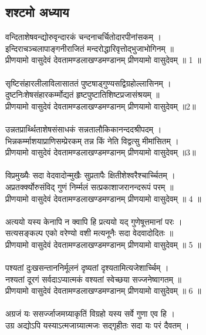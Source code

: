 \subsection{\sanskrit शश्टमो अध्याय}
\sanskrit
 वन्दिताशेषवन्द्योरुवृन्दारकं चन्दनाचर्चितोदारपीनांसकम् ।\\
इन्दिराचञ्चलापाङ्गनीराजितं मन्दरोद्धारिवृत्तोद्भुजाभोगिनम् ॥\\
प्रीणयामो वासुदेवं देवतामण्डलाखण्डमण्डानम् प्रीणयामो वासुदेवम् ॥ 1 ॥\\
\\
 सृष्टिसंहारलीलाविलासाततं पुष्टषाड्गुण्यसद्विग्रहोल्लासिनम् ।\\
दुष्टनिःशेषसंहारकर्म्मोद्यतं हृष्टपुष्टातिशिष्टप्रजासंश्रयम् ॥\\
प्रीणयामो वासुदेवं देवतामण्डलाखण्डमण्डानम् प्रीणयामो वासुदेवम्  ॥2॥\\
\\
उन्नतप्रार्थ्थिताशेषसंसाधकं सन्नतालौकिकानन्ददश्रीपदम् ।\\
भिन्नकर्म्माशयाप्राणिसम्प्रेरकम् तन्न किं नेति विद्वत्सु मीमांसितम् ।\\
प्रीणयामो वासुदेवं देवतामण्डलाखण्डमण्डानम् प्रीणयामो वासुदेवम् ॥3॥\\
\\
विप्रमुख्यैः सदा वेदवादोन्मुखैः सुप्रतापैः क्षितीशेश्वरैश्चार्च्चितम् ।\\
अप्रतर्क्क्योरुसंविद् गुणं निर्म्मलं सत्प्रकाशाजरानन्दरूपं परम् ॥\\
प्रीणयामो वासुदेवं देवतामण्डलाखण्डमण्डानम् प्रीणयामो वासुदेवम् ॥ 4 ॥\\
\\
 अत्ययो यस्य केनापि न क्वापि हि प्रत्ययो यद् गुणेषूत्तमानां परः ।\\
सत्यसङ्कल्प एको वरेण्यो वशी मत्यनूनैः सदा वेदवादोदितः ॥\\
प्रीणयामो वासुदेवं देवतामण्डलाखण्डमण्डानम् प्रीणयामो वासुदेवम् ॥ 5 ॥\\
\\
पश्यतां दुःखसन्ताननिर्मूलनं दृष्यतां दृश्यतामित्यजेशार्च्चिम् ।\\
नश्यतां दूरगं सर्वदाऽप्यात्मकं वश्यतां स्वेच्छया सज्जनेष्वागतम् ॥\\
प्रीणयामो वासुदेवं देवतामण्डलाखण्डमण्डानम्  प्रीणयामो वासुदेवम् ॥ 6 ॥\\
\\
अग्रजं यः ससर्ज्जाजमग्र्याकृतिं विग्रहो यस्य सर्वे गुणा एव हि ।\\
उग्र अद्योऽपि यस्याऽत्मजाग्र्यात्मजः सद्गृहीतः सदा यः परं दैवतम् ।\\
